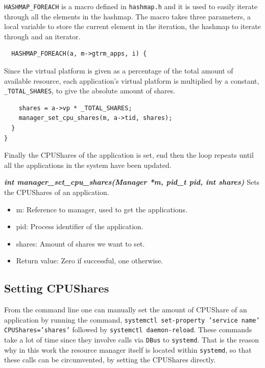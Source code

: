 \documentclass[nobiblatex]{LTHthesis}
\begin{document}
\texttt{HASHMAP\_FOREACH} is a macro defined in \texttt{hashmap.h} and it is
used to easily iterate through all the elements in the hashmap. 
The macro takes three parameters, a local variable to store the current
element in the iteration, the hashmap to iterate through and an iterator.
\begin{lstlisting}
  HASHMAP_FOREACH(a, m->gtrm_apps, i) {
\end{lstlisting}
Since the virtual platform is given as a percentage of the total amount of
available resource, each application's virtual platform is multiplied by a
constant, \texttt{\_TOTAL\_SHARES}, to give the absolute amount of shares.
\begin{lstlisting}
	shares = a->vp * _TOTAL_SHARES;
	manager_set_cpu_shares(m, a->tid, shares);
  }
}
\end{lstlisting}
Finally the CPUShares of the application is set, end then the loop repeats
until all the applications in the system have been updated.

\begin{framed}
	\begin{flushleft}	
		\textbf{\emph{{int manager\_set\_cpu\_shares(Manager *m, pid\_t pid, int shares)}}} \newline
		Sets the CPUShares of an application.
		\begin{itemize}
		\item m: Reference to manager, used to get the applications.
		\item pid: Process identifier of the application.
		\item shares: Amount of shares we want to set.
		\item Return value: Zero if successful, one otherwise.
		\end{itemize}
	\end{flushleft}	
\end{framed}

\subsection{Setting CPUShares}
From the command line one can manually set the amount of CPUShare of 
an application by running the command, 
\texttt{systemctl set-property 'service name' CPUShares='shares'} followed 
by \texttt{systemctl daemon-reload}. These commands take a lot of time since
they involve calls via \texttt{DBus} to \texttt{systemd}. That is the reason
why in this work the resource manager itself is located within 
\texttt{systemd}, so that these calls can be circumvented, by setting 
the CPUShares directly.
\end{document}
